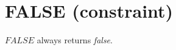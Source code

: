 \section{FALSE (constraint)}\label{false:falseconstraint}\hypertarget{false:falseconstraint}{}
\(FALSE\) always returns \emph{false}.
